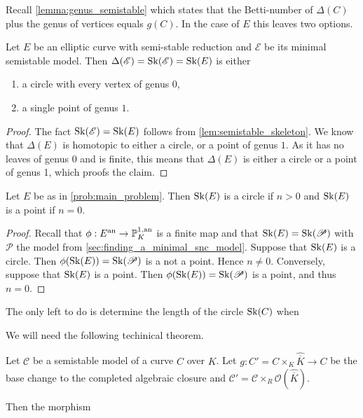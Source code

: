 Recall \cref{lemma:genus_semistable} which states that the Betti-number of $\Delta(C)$ plus the genus of vertices equals $g(C)$. 
In the case of $E$ this leaves two options. 
\begin{lemma}\label{lem:point_or_circle}
	Let $E$ be an elliptic curve with semi-stable reduction and $\mathscr E$ be its minimal semistable model. 
	Then $\Delta(\mathscr E) = \operatorname{Sk}(\mathscr E) = \operatorname{Sk}(E)$ is either 
	\begin{enumerate}
		\item a circle with every vertex of genus $0$,
		\item a single point of genus  $1$. 
	\end{enumerate}
\end{lemma}
\begin{proof}
	The fact $\operatorname{Sk}(\mathscr E) = \operatorname{Sk}(E)$ follows from \cref{lem:semistable_skeleton}. 
	We know that $\Delta(E)$ is homotopic to either a circle, or a point of genus $1$. 
	As it has no leaves of genus $0$ and is finite, this means that $\Delta(E)$ is either a circle or a point of genus 1, which proofs the claim.
\end{proof}

\begin{lemma}
	Let $E$ be as in \cref{prob:main_problem}. 
	Then $\operatorname{Sk}(E)$ is a circle if $n > 0$ and $\operatorname{Sk}(E)$ is a point if $n = 0$. 
\end{lemma}
\begin{proof}
	Recall that $\phi: E{}^{\text{an}} \to \mathbb{P}^{1, \text{an}}_K$ is a finite map and that $\operatorname{Sk}(E) = \operatorname{Sk}(\mathscr P)$ with $\mathscr P$ the model from \cref{sec:finding_a_minimal_snc_model}.
	Suppose that $\operatorname{Sk}(E)$ is a circle. 
	Then $\phi(\operatorname{Sk}(E))= \operatorname{Sk}(\mathscr P)$ is a not a point. 
	Hence $n \ne 0$. 
	Conversely, suppose that $\operatorname{Sk}(E)$ is a point. 
	Then $\phi(\operatorname{Sk}(E)) = \operatorname{Sk}(\mathscr P)$ is a point, and thus $n  = 0$. 
\end{proof}

The only left to do is determine the length of the circle $\operatorname{Sk}(C)$ when 





We will need the following techinical theorem. 
\begin{theorem}
	Let $\mathscr C$ be a semistable model of a curve $C$ over $K$. 
	Let $g: C' = C \times _{K} \hat{\overline{K}} \to C $ be the base change to the completed algebraic closure and $\mathscr C' = \mathscr C \times _{R} \mathcal{O}\left(\hat{\overline{K}}\right)$. 
	
	Then the morphism 
	

\end{theorem}
